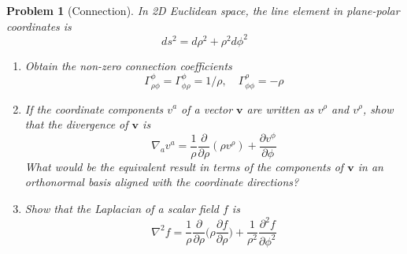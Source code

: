 \documentclass[a4paper]{article}
\theoremstyle{new2}
\theoremstyle{new}
\newtheorem{qns}{Problem}[section]
\begin{document}
\newpage
\begin{qns}[Connection]
In 2D Euclidean space, the line element in plane-polar coordinates is
$$ds^2=d\rho^2+\rho^2d\phi^2$$
\begin{enumerate}[label=(\alph*)]
\item Obtain the non-zero connection coefficients
$$\Gamma_{\rho\phi}^\phi=\Gamma_{\phi\rho}^\phi=1/\rho,\quad\Gamma_{\phi\phi}^\rho=-\rho$$
\item If the coordinate components $v^a$ of a vector $\mathbf{v}$ are written as $v^\rho$ and $v^\rho$, show that the divergence of $\mathbf{v}$ is
$$\nabla_av^a=\frac{1}{\rho}\frac{\partial}{\partial\rho}(\rho v^\rho)+\frac{\partial v^\phi}{\partial\phi}$$
What would be the equivalent result in terms of the components of $\mathbf{v}$ in an orthonormal basis aligned with the coordinate directions?
\item Show that the Laplacian of a scalar field $f$ is
$$\nabla^2f=\frac{1}{\rho}\frac{\partial}{\partial\rho}\bigg(\rho\frac{\partial f}{\partial\rho}\bigg)+\frac{1}{\rho^2}\frac{\partial^2f}{\partial\phi^2}$$
\end{enumerate}
\end{qns}
\end{document}
